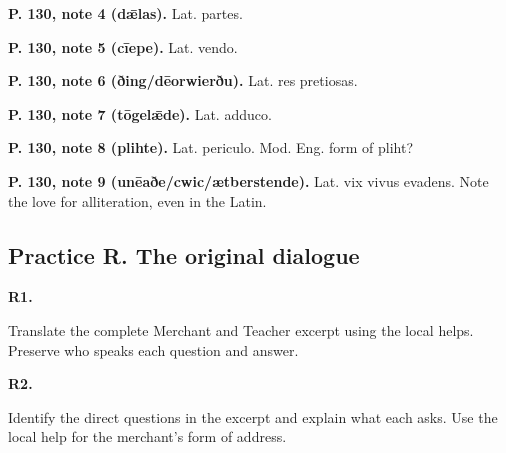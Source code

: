 \textbf{P. 130, note 4 (dǣlas).} Lat. partes.

\textbf{P. 130, note 5 (cīepe).} Lat. vendo.

\textbf{P. 130, note 6 (ðing/\allowbreak{}dēorwierðu).} Lat. res pretiosas.

\textbf{P. 130, note 7 (tōgelǣde).} Lat. adduco.

\textbf{P. 130, note 8 (plihte).} Lat. periculo. Mod. Eng. form of pliht?

\textbf{P. 130, note 9 (unēaðe/\allowbreak{}cwic/\allowbreak{}ætberstende).} Lat. vix vivus evadens. Note the love for alliteration, even in the Latin.

\subsection*{Practice R. The original dialogue}

\par\begin{minipage}{\linewidth}\raggedright
\textbf{R1.}

Translate the complete Merchant and Teacher excerpt using the local helps. Preserve who speaks each question and answer.

\end{minipage}\par\addvspace{4pt}

\par\begin{minipage}{\linewidth}\raggedright
\textbf{R2.}

Identify the direct questions in the excerpt and explain what each asks. Use the local help for the merchant’s form of address.

\end{minipage}\par\addvspace{4pt}


